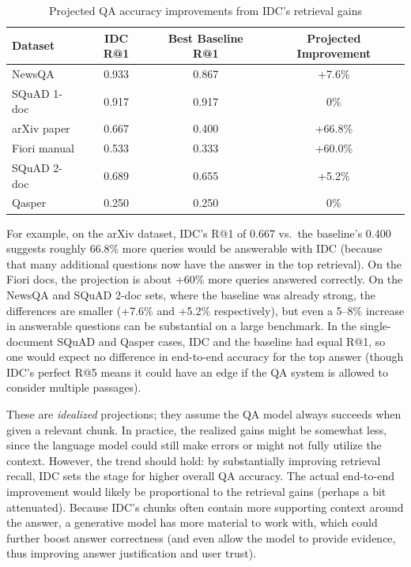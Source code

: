 \documentclass[12pt,a4paper]{report}
\begin{document}
\begin{table}[h!]
\centering
\caption{Projected QA accuracy improvements from IDC's retrieval gains}
\label{tab:projected_gains}
\begin{tabular}{lccc}
\hline
\textbf{Dataset} & \textbf{IDC R@1} & \textbf{Best Baseline R@1} & \textbf{Projected Improvement} \\
\hline
NewsQA & 0.933 & 0.867 & +7.6\% \\
SQuAD 1-doc & 0.917 & 0.917 & 0\% \\
arXiv paper & 0.667 & 0.400 & +66.8\% \\
Fiori manual & 0.533 & 0.333 & +60.0\% \\
SQuAD 2-doc & 0.689 & 0.655 & +5.2\% \\
Qasper & 0.250 & 0.250 & 0\% \\
\hline
\end{tabular}
\end{table}

For example, on the arXiv dataset, IDC's R@1 of 0.667 vs.\ the baseline's 0.400 suggests roughly 66.8\% more queries would be answerable with IDC (because that many additional questions now have the answer in the top retrieval). On the Fiori docs, the projection is about +60\% more queries answered correctly. On the NewsQA and SQuAD 2-doc sets, where the baseline was already strong, the differences are smaller (+7.6\% and +5.2\% respectively), but even a 5--8\% increase in answerable questions can be substantial on a large benchmark. In the single-document SQuAD and Qasper cases, IDC and the baseline had equal R@1, so one would expect no difference in end-to-end accuracy for the top answer (though IDC's perfect R@5 means it could have an edge if the QA system is allowed to consider multiple passages). 

These are \textit{idealized} projections; they assume the QA model always succeeds when given a relevant chunk. In practice, the realized gains might be somewhat less, since the language model could still make errors or might not fully utilize the context. However, the trend should hold: by substantially improving retrieval recall, IDC sets the stage for higher overall QA accuracy. The actual end-to-end improvement would likely be proportional to the retrieval gains (perhaps a bit attenuated). Because IDC's chunks often contain more supporting context around the answer, a generative model has more material to work with, which could further boost answer correctness (and even allow the model to provide evidence, thus improving answer justification and user trust).
\end{document}
